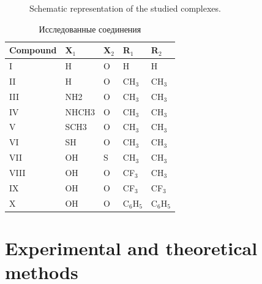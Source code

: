 \documentclass[a4paper,fleqn]{cas-dc}
\begin{document}
\begin{figure}[ht]
\caption{Schematic representation of the studied complexes.}
\label{Ris_1_Structur_formula}
\end{figure}

\begin{table}[t]
\caption{Исследованные соединения}
\centering
\label{tab1}
\begin{tabular}{lllll}
\hline
Compound & X$_1$  & X$_2$  & R$_1$      & R$_2$      \\ \hline
I        & H      & O      & H          & H          \\
II       & H      & O      & CH$_3$     & CH$_3$     \\
III      & NH2    & O      & CH$_3$     & CH$_3$     \\
IV       & NHCH3  & O      & CH$_3$     & CH$_3$     \\
V        & SCH3   & O      & CH$_3$     & CH$_3$     \\
VI       & SH     & O      & CH$_3$     & CH$_3$     \\
VII      & OH     & S      & CH$_3$     & CH$_3$     \\
VIII     & OH     & O      & CF$_3$     & CH$_3$     \\
IX       & OH     & O      & CF$_3$     & CF$_3$     \\
X        & OH     & O      & C$_6$H$_5$ & C$_6$H$_5$ \\ \hline
\end{tabular}
\end{table}

\section{Experimental and theoretical methods}
\end{document}
